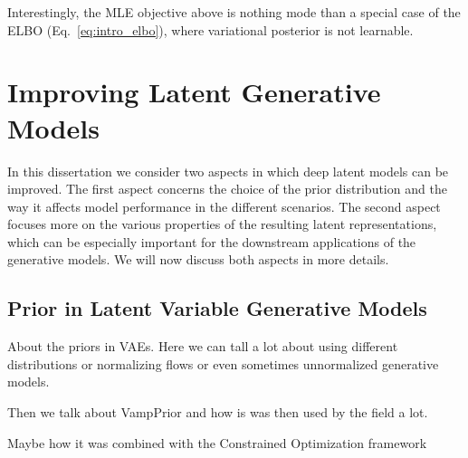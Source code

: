 Interestingly, the MLE objective above is nothing mode than a special case of the ELBO (Eq.~\ref{eq:intro_elbo}), where variational posterior is not learnable.



\section{Improving Latent Generative Models}
In this dissertation we consider two aspects in which deep latent models can be improved. The first aspect concerns the choice of the prior distribution and the way it affects model performance in the different scenarios. The second aspect focuses more on the various properties of the resulting latent representations, which can be especially important for the downstream applications of the generative models. We will now discuss both aspects in more details. 

\subsection{Prior in Latent Variable Generative Models}
About the priors in VAEs. Here we can tall a lot about using different distributions or normalizing flows or even sometimes unnormalized generative models. 

Then we talk about VampPrior and how is was then used by the field a lot. 

Maybe how it was combined with the Constrained Optimization framework



